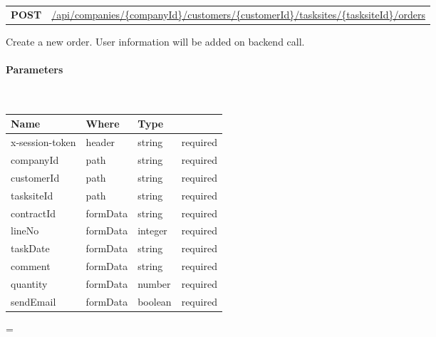 \documentclass[10pt]{article}
\newcommand{\method}[2]{
    \begin{mdframed}[style=#1]
        \color{white}
        \begin{tabularx}{\textwidth}{lX}
            \MakeUppercase{\textbf{#1}} & #2 \\
        \end{tabularx}
    \end{mdframed}
}
\newenvironment{absolutelynopagebreak}
  {\par\nobreak\vfil\penalty0\vfilneg
   \vtop\bgroup}
  {\par\xdef\tpd{\the\prevdepth}\egroup
   \prevdepth=\tpd}
\begin{document}
            \begin{absolutelynopagebreak}
                \label{route:5743ac44b5e8373c2dc973baa1c2b897}
                \method{post}{\url{/api/companies/{companyId}/customers/{customerId}/tasksites/{tasksiteId}/orders}}

                \begin{flushleft}
                    Create a new order. User information will be added on backend call.
                    \vspace{.25cm}

                    \paragraph{Parameters}\mbox{}\\
                    \vspace{.25cm}
                    \begin{tabularx}{\textwidth}{lXlr}
                        \textbf{Name} & \textbf{Where} & \textbf{Type} \\
                        \hline
                            x-session-token & header & string & required \\
                            companyId & path & string & required \\
                            customerId & path & string & required \\
                            tasksiteId & path & string & required \\
                            contractId & formData & string & required \\
                            lineNo & formData & integer & required \\
                            taskDate & formData & string & required \\
                            comment & formData & string & required \\
                            quantity & formData & number & required \\
                            sendEmail & formData & boolean & required \\
                    \end{tabularx}


\end{flushleft}
\end{absolutelynopagebreak}
\end{document}
